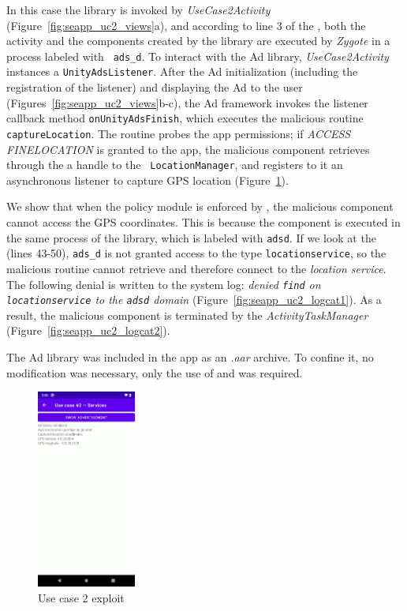 In this case the library is invoked by {\em UseCase2Activity}
(Figure~\ref{fig:seapp_uc2_views}a), and according to line 3 of the
\seappcontexts, both the activity and the components created by the
library are executed by {\em Zygote} in a process labeled with {\tt
  ads\_d}.  To interact with the Ad library, {\em UseCase2Activity}
instances a {\tt UnityAdsListener}.  After the Ad initialization
(including the registration of the listener) and displaying the Ad to
the user (Figures~\ref{fig:seapp_uc2_views}b-c), the Ad framework
invokes the listener callback method {\tt onUnityAdsFinish}, which
executes the malicious routine {\tt captureLocation}. The routine
probes the app permissions; if {\em ACCESS\textunderscore
  FINE\textunderscore LOCATION} is granted to the app, the malicious
component retrieves through the \servicemanager a handle to the {\tt
  LocationManager}, and registers to it an asynchronous listener to
capture GPS location (Figure~\ref{fig:seapp_uc2_exploit}).

We show that when the policy module is enforced by \pap, the malicious
component cannot access the GPS coordinates. This is because the
component is executed in the same process of the library, which is
labeled with {\tt ads\textunderscore d}. If we look at the \sepolicy
(lines 43-50), {\tt ads\_d} is not granted access to the \sel type
{\tt location\textunderscore service}, so the malicious routine cannot
retrieve and therefore connect to the {\em location\textunderscore
  service}.  The following denial is written to the system log: {\em
  denied {\tt find} on {\tt location\textunderscore service} to the
  {\tt ads\textunderscore d} domain}
(Figure~\ref{fig:seapp_uc2_logcat1}). As a result, the malicious
component is terminated by the {\em ActivityTaskManager}
(Figure~\ref{fig:seapp_uc2_logcat2}).

The Ad library was included in the app as an {\em .aar}
archive. To confine it, no modification was necessary, only
the use of \manifest and \sepolicy was required.

\begin{figure}[h]
  \centering
\includegraphics[width=0.29\textwidth]{chapters/seapp/figs/ae/uc24.png}
  \caption{\label{fig:seapp_uc2_exploit} Use case 2 exploit}  
\end{figure}  

